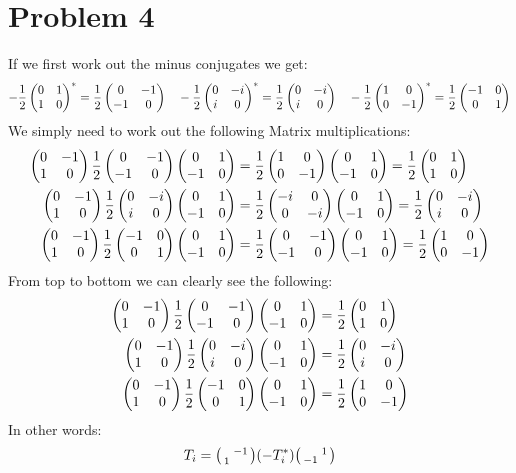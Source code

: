 \documentclass[12pt]{article}
\newcommand{\Px}{\frac{1}{2}\pmqty{0&-1\\-1&0}}
\newcommand{\Py}{\frac{1}{2}\pmqty{0&-i\\i&0}}
\newcommand{\Pz}{\frac{1}{2}\pmqty{-1&0\\0&1}}
\newcommand{\Um}{\pmqty{0&-1\\1&0}}
\newcommand{\UmT}{\pmqty{0&1\\-1&0}}
\newcommand{\px}{\frac{1}{2}\pmqty{0&1\\1&0}}
\newcommand{\py}{\frac{1}{2}\pmqty{0&-i\\i&0}}
\newcommand{\pz}{\frac{1}{2}\pmqty{1&0\\0&-1}}
\begin{document}
\section*{Problem 4}
If we first work out the minus conjugates we get:
\begin{align*}
  -\px^*=\Px\quad-\py^*=\Py\quad-\pz^*=\Pz
\end{align*}
We simply need to work out the following Matrix multiplications:
\begin{align*}
  \Um\Px\UmT&=\frac{1}{2}\pmqty{\dmat[0]{1,-1}}\UmT=\frac{1}{2}\pmqty{0&1\\1&0}\\
  \Um\Py\UmT&=\frac{1}{2}\pmqty{\dmat[0]{-i,-i}}\UmT=\frac{1}{2}\pmqty{0&-i\\i&0}\\
  \Um\Pz\UmT&=\frac{1}{2}\pmqty{0&-1\\-1&0}\UmT=\frac{1}{2}\pmqty{1&0\\0&-1}
\end{align*}
From top to bottom we can clearly see the following:
\begin{align*}
  \Um\Px\UmT&=\px\\
  \Um\Py\UmT&=\py\\
  \Um\Pz\UmT&=\pz
\end{align*}
In other words:
\begin{align*}
  T_i=\spmqty{&-1\\1&}\qty(-T_i^*)\spmqty{&1\\-1&}
\end{align*}
\end{document}
